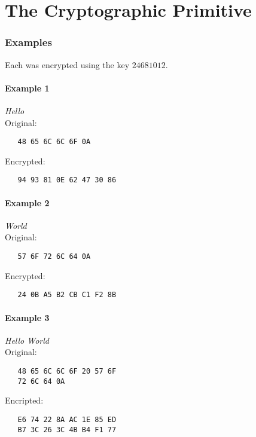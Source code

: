 \documentclass[10pt]{article}
\begin{document}
\maketitle

\begin{abstract}
  {DES} is the 56-bit block cipher that was once used to encrypt all US Government non-classified documents.
\end{abstract}

\newpage

\part{The Cryptographic Primitive}

\section{Examples}
Each was encrypted using the key $24681012$.
\subsection{Example 1}
\textit{Hello}
\\\indent Original:
\begin{verbatim}
   48 65 6C 6C 6F 0A
\end{verbatim}
\indent Encrypted:
\begin{verbatim}
   94 93 81 0E 62 47 30 86
\end{verbatim}

\subsection{Example 2}
\textit{World}
\\\indent Original:
\begin{verbatim}
   57 6F 72 6C 64 0A
\end{verbatim}
\indent Encrypted:
\begin{verbatim}
   24 0B A5 B2 CB C1 F2 8B
\end{verbatim}

\subsection{Example 3}
\textit{Hello World}
\\\indent Original:
\begin{verbatim}
   48 65 6C 6C 6F 20 57 6F
   72 6C 64 0A
\end{verbatim}
\indent Encripted:
\begin{verbatim}
   E6 74 22 8A AC 1E 85 ED
   B7 3C 26 3C 4B B4 F1 77
\end{verbatim}
\end{document}

